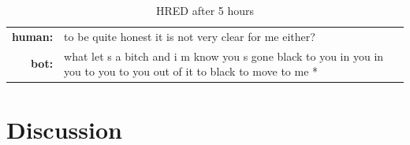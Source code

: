\documentclass[letterpaper]{article}
\begin{document}
\begin{table}[bt!]
    \centering
    \small
    \caption{\small HRED after 5 hours}
    \begin{tabularx}{0.48\textwidth}{rX}
        \hline \hline
        \textbf{human:} & to be quite honest it is not very clear for me either?    \\
        \textbf{bot:} & what let s a  bitch and i m know you s gone black to you in you in you to you to you out of it to black to move to me *\\
        \hline \hline    
    \end{tabularx}
    \label{table:mi_03}
\end{table}







\section{Discussion}

%
%


\end{document}
